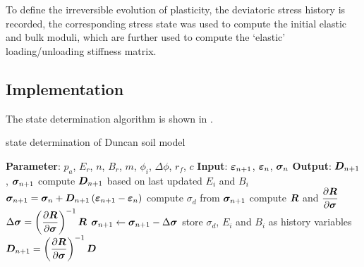 To define the irreversible evolution of plasticity, the deviatoric stress history is recorded, the corresponding stress state was used to compute the initial elastic and bulk moduli, which are further used to compute the `elastic' loading/unloading stiffness matrix.
\subsection{Implementation}
The state determination algorithm is shown in .
\begin{breakablealgorithm}
\caption{state determination of Duncan soil model}\label{algo:duncan_model}
\begin{algorithmic}
\State \textbf{Parameter}: $p_a$, $E_r$, $n$, $B_r$, $m$, $\phi_i$, $\Delta\phi$, $r_f$, $c$
\State \textbf{Input}: $\bm{\varepsilon}_{n+1}$, $\bm{\varepsilon}_n$, $\bm{\sigma}_n$
\State \textbf{Output}: $\bm{D}_{n+1}$, $\bm{\sigma}_{n+1}$
\State compute $\bm{D}_{n+1}$ based on last updated $E_i$ and $B_i$
\State $\bm{\sigma}_{n+1}=\bm{\sigma}_n+\bm{D}_{n+1}\left(\bm{\varepsilon}_{n+1}-\bm{\varepsilon}_{n}\right)$
\State compute $\sigma_d$ from $\bm{\sigma}_{n+1}$
\State \Return{}
\EndIf
{}
\State compute $\bm{R}$ and $\dfrac{\partial{\bm{R}}}{\partial{\bm{\sigma}}}$
\State $\Delta\bm{\sigma}=\left(\dfrac{\partial{\bm{R}}}{\partial{\bm{\sigma}}}\right)^{-1}\bm{R}$
\State $\bm{\sigma}_{n+1}\leftarrow\bm{\sigma}_{n+1}-\Delta\bm{\sigma}$
\EndWhile
\State store $\sigma_d$, $E_i$ and $B_i$ as history variables
\State $\bm{D}_{n+1}=\left(\dfrac{\partial{\bm{R}}}{\partial{\bm{\sigma}}}\right)^{-1}\bm{D}$
\end{algorithmic}
\end{breakablealgorithm}

